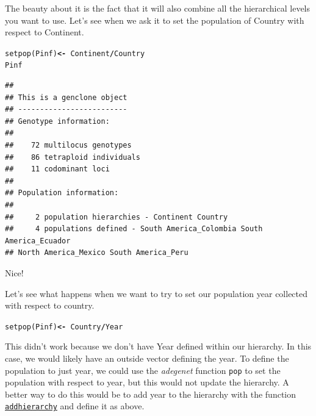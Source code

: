 \documentclass[letterpaper]{article}\usepackage[]{graphicx}\usepackage[]{color}
\makeatletter
\newcommand{\hlopt}[1]{\textcolor[rgb]{1,0,0.502}{\textbf{#1}}}%
\newcommand{\hlstd}[1]{\textcolor[rgb]{0,0,0}{#1}}%
\newcommand{\hlkwb}[1]{\textcolor[rgb]{0.502,0.502,0.753}{\textbf{#1}}}%
\newcommand{\hlkwd}[1]{\textcolor[rgb]{0,0.267,0.4}{#1}}%
\newenvironment{kframe}{%
 \def\at@end@of@kframe{}%
 \ifinner\ifhmode%
  \def\at@end@of@kframe{\end{minipage}}%
  \begin{minipage}{\columnwidth}%
 \fi\fi%
 \def\FrameCommand##1{\hskip\@totalleftmargin \hskip-\fboxsep
 \colorbox{shadecolor}{##1}\hskip-\fboxsep
     \hskip-\linewidth \hskip-\@totalleftmargin \hskip\columnwidth}%
 \MakeFramed {\advance\hsize-\width
   \@totalleftmargin\z@ \linewidth\hsize
   \@setminipage}}%
 {\par\unskip\endMakeFramed%
 \at@end@of@kframe}
\newenvironment{knitrout}{}{} %
\newcommand{\cmdlink}[2]{
  \texttt{\hyperref[#1]{#2}}
}
\makeatother
\begin{document}
\noindent
The beauty about it is the fact that it will also combine all the hierarchical
levels you want to use. Let's see when we ask it to set the population of
Country with respect to Continent.

\begin{knitrout}\footnotesize
{}\color{fgcolor}\begin{kframe}
\begin{alltt}
\hlkwd{setpop}\hlstd{(Pinf)} \hlkwb{<-} \hlopt{~}\hlstd{Continent}\hlopt{/}\hlstd{Country}
\hlstd{Pinf}
\end{alltt}
\begin{verbatim}
## 
## This is a genclone object
## -------------------------
## Genotype information:
## 
##    72 multilocus genotypes
##    86 tetraploid individuals
##    11 codominant loci
## 
## Population information:
## 
##     2 population hierarchies - Continent Country
##     4 populations defined - South America_Colombia South America_Ecuador 
## North America_Mexico South America_Peru
\end{verbatim}
\end{kframe}
\end{knitrout}

\noindent
Nice!

Let's see what happens when we want to try to set our population year collected
with respect to country.

\begin{knitrout}\footnotesize
{}\color{fgcolor}\begin{kframe}
\begin{alltt}
\hlkwd{setpop}\hlstd{(Pinf)} \hlkwb{<-} \hlopt{~}\hlstd{Country}\hlopt{/}\hlstd{Year}
\end{alltt}


{\ttfamily\noindent\bfseries\color{errorcolor}{\#\# Error: One or more levels in the given hierarchy is not present in the data frame. \\\#\# Hierarchy:	 Country, Year \\\#\# Data:		 Continent, Country}}\end{kframe}
\end{knitrout}

\noindent
This didn't work because we don't have Year defined within our hierarchy. In this
case, we would likely have an outside vector defining the year. To define the 
population to just year, we could use the \textit{adegenet} function \texttt{pop}
to set the population with respect to year, but this would not update the
hierarchy. A better way to do this would be to add year to the hierarchy with the
function \cmdlink{data.manip:hier:manip}{addhierarchy} and define it as above.
\end{document}
